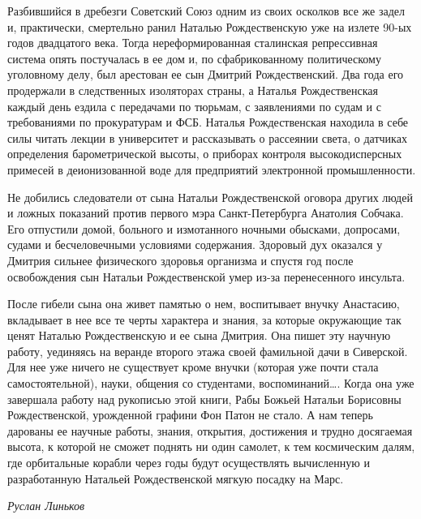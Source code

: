 Разбившийся в дребезги Советский Союз одним из своих осколков все же задел и, практически, смертельно ранил Наталью Рождественскую уже на излете 90-ых годов двадцатого века. Тогда нереформированная сталинская репрессивная система опять постучалась в ее дом и, по сфабрикованному политическому уголовному делу, был арестован ее сын Дмитрий Рождественский. Два года его продержали в следственных изоляторах страны, а Наталья Рождественская каждый день ездила с передачами по тюрьмам, с заявлениями по судам и с требованиями по прокуратурам и ФСБ. Наталья Рождественская находила в себе силы читать лекции в университет и рассказывать о рассеянии света, о датчиках определения барометрической высоты, о приборах контроля высокодисперсных примесей в деионизованной воде для предприятий электронной промышленности.

Не добились следователи от сына Натальи Рождественской оговора других людей и ложных показаний против первого мэра Санкт-Петербурга Анатолия Собчака. Его отпустили домой, больного и измотанного ночными обысками, допросами, судами и бесчеловечными условиями содержания. Здоровый дух оказался у Дмитрия сильнее физического здоровья организма и спустя год после освобождения сын Натальи Рождественской умер из-за перенесенного инсульта.

\thispagestyle{myheadings}

После гибели сына она живет памятью о нем, воспитывает внучку Анастасию, вкладывает в нее все те черты характера и знания, за которые окружающие так ценят Наталью Рождественскую и ее сына Дмитрия. Она пишет эту научную работу, уединяясь на веранде второго этажа своей фамильной дачи в Сиверской. Для нее уже ничего не существует кроме внучки (которая уже почти стала самостоятельной), науки, общения со студентами, воспоминаний…. Когда она уже завершала работу над рукописью этой книги, Рабы Божьей Натальи Борисовны Рождественской, урожденной графини Фон Патон не стало. А нам теперь дарованы ее научные работы, знания, открытия, достижения и трудно досягаемая высота, к которой не сможет поднять ни один самолет, к тем космическим далям, где орбитальные корабли через годы будут осуществлять вычисленную и разработанную Натальей Рождественской мягкую посадку на Марс.


\vskip 4mm
\hfill{\it Руслан Линьков}

\pagestyle{myheadings}
